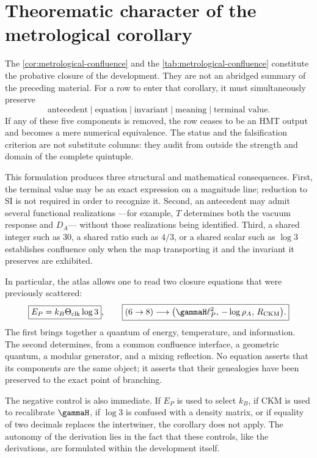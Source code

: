 \section{Theorematic character of the metrological corollary}

The \cref{cor:metrological-confluence} and the
\cref{tab:metrological-confluence} constitute the probative closure of the
development. They are not an abridged summary of the preceding material. For a row
to enter that corollary, it must simultaneously preserve
\[
\text{antecedent}\mid\text{equation}\mid\text{invariant}
\mid\text{meaning}\mid\text{terminal value}.
\]
If any of these five components is removed, the row ceases to be an
HMT output and becomes a mere numerical equivalence. The status and
the falsification criterion are not substitute columns: they audit from outside the strength and
domain of the complete quintuple.

This formulation produces three structural and mathematical consequences.
First, the terminal value may be an exact expression on a magnitude
line; reduction to SI is not required in order to recognize it. Second, an antecedent
may admit several functional realizations ---for example, \(T\)
determines both the vacuum response and \(D_A\)--- without those
realizations being identified.
Third, a shared integer such as \(30\), a shared ratio such as \(4/3\),
or a shared scalar such as \(\log3\) establishes confluence only when the
map transporting it and the invariant it preserves are exhibited.

In particular, the atlas allows one to read two closure equations that were previously scattered:
\begin{equation}
\boxed{E_P=k_B\Theta_{\rm clk}\log3},
\qquad
\boxed{
(6\to8)\longrightarrow
\bigl(\gammaH\ell_P^2,\,-\log\rho_A,\,R_{\rm CKM}\bigr).}
\label{eq:status-two-confluences}
\end{equation}
The first brings together a quantum of energy, temperature, and information. The
second determines, from a common confluence interface, a geometric quantum, a
modular generator, and a mixing reflection. No equation asserts that its
components are the same object; it asserts that their genealogies have been
preserved to the exact point of branching.

The negative control is also immediate. If \(E_P\) is used to select
\(k_B\), if CKM is used to recalibrate \(\gammaH\), if \(\log3\) is confused
with a density matrix, or if equality of two decimals replaces the
intertwiner, the corollary does not apply. The autonomy of the derivation lies in the fact
that these controls, like the derivations, are formulated within
the development itself.

